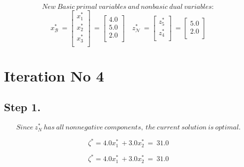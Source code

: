 \documentclass [12pt] {article}
\begin{document}
\[
New\ Basic\ primal\ variables\ and\ nonbasic\ dual\ variables:
\]
\[
x_{\mathcal B}^{*}\ =\begin{bmatrix}
x_{1}^{*} \\x_{2}^{*} \\x_{3}^{*} \\
\end{bmatrix}\ =\begin{bmatrix}
4.0 \\ 5.0 \\ 2.0 \\ 
\end{bmatrix}\quad
z_{\mathcal N}^{*}\ =\begin{bmatrix}
z_{5}^{*} \\z_{4}^{*} \\
\end{bmatrix}\ =\begin{bmatrix}
5.0 \\ 2.0 \\ 
\end{bmatrix}
\]
\section*{Iteration No 4}
\subsection{Step 1.}
\[
Since\ z_\mathit{N}^*\ has\ all\ nonnegative\ components,\ the\ current\ solution\ is\ optimal.
\]

\[
\zeta^{*} = 4.0x_{1}^{*}\ +3.0x_{2}^{*}\ =\ 31.0
\]

\[
\zeta^{*} = 4.0x_{1}^{*}\ +3.0x_{2}^{*}\ =\ 31.0
\]
 
\end{document}

